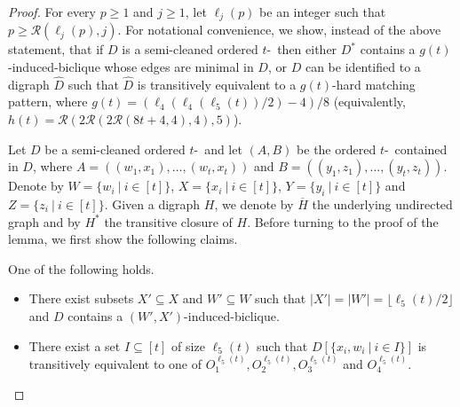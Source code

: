 \semicleantoclean*

\begin{proof}
For every $p \geq 1$ and $j \geq 1$, let $\ell_j(p)$ be an integer such that $p \geq \mathcal{R}(\ell_j(p),j)$.
For notational convenience, we show, instead of the above statement, that if $D$ is a semi-cleaned ordered $t$-\toughpair\ then either $D^*$ contains a $g(t)$-induced-biclique whose edges are minimal in $D$, or $D$ can be identified to a digraph $\hat{D}$ such that $\hat{D}$ is transitively equivalent to a $g(t)$-hard matching pattern, where $g(t) = (\ell_4(\ell_4(\ell_5(t))/2)-4)/8$ (equivalently, $h(t) = \mathcal{R}(2\mathcal{R}(2\mathcal{R}(8t+4,4),4),5)$).

Let $D$ be a semi-cleaned ordered $t$-\toughpair\ and let $(A,B)$ be the ordered $t$-\toughpair\ contained in $D$,
where $A = ((w_1,x_1),\ldots,(w_t,x_t))$ and $B = ((y_1,z_1),\ldots,(y_t,z_t))$.
Denote by $W= \{w_i~|~i \in [t]\}$, $X = \{x_i~|~i \in [t]\}$, $Y= \{y_i~|~i \in [t]\}$ and $Z= \{z_i~|~i\in [t]\}$.
Given a digraph $H$, we denote by $\overline{H}$ the underlying undirected graph and by $H^*$ the transitive closure of $H$. Before turning to the proof of the lemma, we first show the following claims. 

\begin{claim}
\label{clm:ramseyA}
One of the following holds.
\begin{itemize}
\item[(1)] There exist subsets $X' \subseteq X$ and $W' \subseteq W$ such that $|X'| = |W'| = \lfloor \ell_5(t)/2 \rfloor$ and $D$ contains a $(W',X')$-induced-biclique.
\item[(2)] There exist a set $I \subseteq [t]$ of size $\ell_5(t)$ such that $D[\{x_i,w_i~|~i \in I\}]$ is transitively equivalent to one of $O_1^{\ell_5(t)},O_2^{\ell_5(t)},O_3^{\ell_5(t)}$ and $O_4^{\ell_5(t)}$.
\end{itemize}
\end{claim}


\end{proof}
